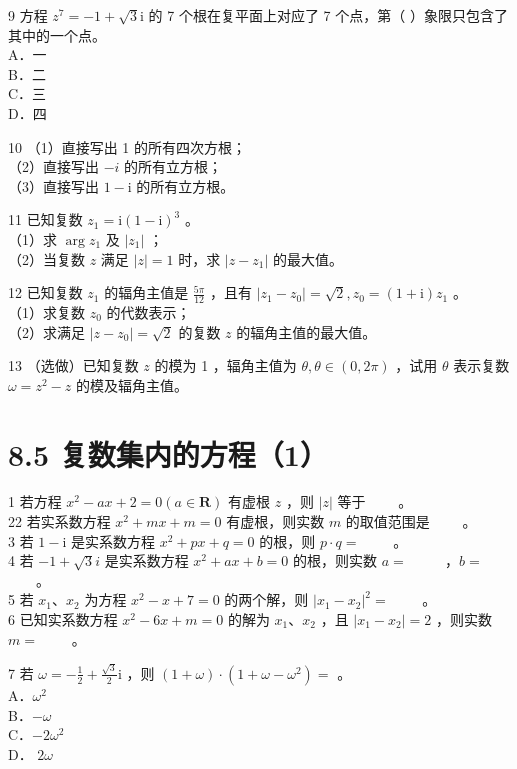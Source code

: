 \documentclass[10pt]{article}
\begin{document}
9 方程 \(z^{7}=-1+\sqrt{3} \mathrm{i}\) 的 7 个根在复平面上对应了 7 个点，第（ ）象限只包含了其中的一个点。\\
A．一\\
B．二\\
C．三\\
D．四

10 （1）直接写出 1 的所有四次方根；\\
（2）直接写出 \(-i\) 的所有立方根；\\
（3）直接写出 \(1-\mathrm{i}\) 的所有立方根。

11 已知复数 \(z_{1}=\mathrm{i}(1-\mathrm{i})^{3}\) 。\\
（1）求 \(\arg z_{1}\) 及 \(\left|z_{1}\right|\) ；\\
（2）当复数 \(z\) 满足 \(|z|=1\) 时，求 \(\left|z-z_{1}\right|\) 的最大值。

12 已知复数 \(z_{1}\) 的辐角主值是 \(\frac{5 \pi}{12}\) ，且有 \(\left|z_{1}-z_{0}\right|=\sqrt{2}, z_{0}=(1+\mathrm{i}) z_{1}\) 。\\
（1）求复数 \(z_{0}\) 的代数表示；\\
（2）求满足 \(\left|z-z_{0}\right|=\sqrt{2}\) 的复数 \(z\) 的辐角主值的最大值。

13 （选做）已知复数 \(z\) 的模为 1 ，辐角主值为 \(\theta, \theta \in(0,2 \pi)\) ，试用 \(\theta\) 表示复数 \(\omega=z^{2}-z\) 的模及辐角主值。

\section*{8.5 复数集内的方程（1）}
1 若方程 \(x^{2}-a x+2=0(a \in \mathbf{R})\) 有虚根 \(z\) ，则 \(|z|\) 等于 \(\qquad\)。\\
22 若实系数方程 \(x^{2}+m x+m=0\) 有虚根，则实数 \(m\) 的取值范围是 \(\qquad\)。\\
3 若 \(1-\mathrm{i}\) 是实系数方程 \(x^{2}+p x+q=0\) 的根，则 \(p \cdot q=\) \(\qquad\)。\\
4 若 \(-1+\sqrt{3} i\) 是实系数方程 \(x^{2}+a x+b=0\) 的根，则实数 \(a=\) \(\qquad\) ，\(b=\) \(\qquad\)。\\
5 若 \(x_{1} 、 x_{2}\) 为方程 \(x^{2}-x+7=0\) 的两个解，则 \(\left|x_{1}-x_{2}\right|^{2}=\) \(\qquad\)。\\
6 已知实系数方程 \(x^{2}-6 x+m=0\) 的解为 \(x_{1} 、 x_{2}\) ，且 \(\left|x_{1}-x_{2}\right|=2\) ，则实数 \(m=\) \(\qquad\)。

7 若 \(\omega=-\frac{1}{2}+\frac{\sqrt{3}}{2} \mathrm{i}\) ，则 \((1+\omega) \cdot\left(1+\omega-\omega^{2}\right)=\) 。\\
A．\(\omega^{2}\)\\
B．\(-\omega\)\\
C．\(-2 \omega^{2}\)\\
D． \(2 \omega\)
\end{document}
